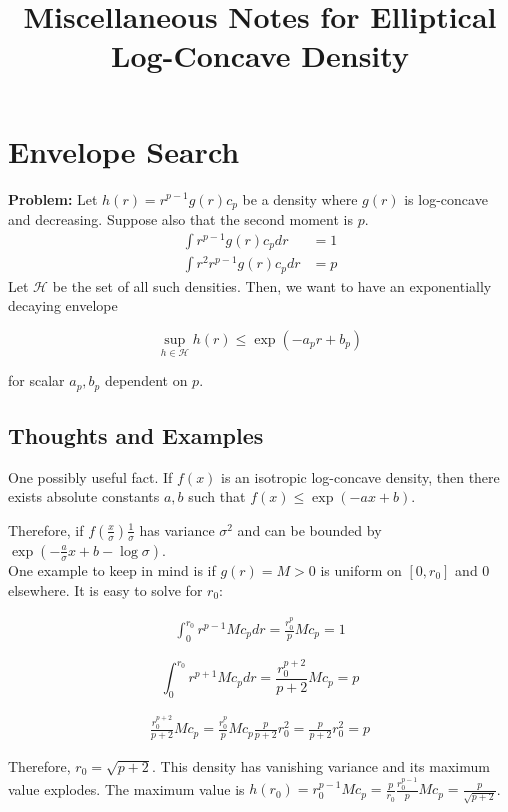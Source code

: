 \documentclass{article}
\title{Miscellaneous Notes for Elliptical Log-Concave Density}
\begin{document}
\maketitle

\section{Envelope Search}

\textbf{Problem:} Let $h(r) = r^{p-1} g(r) c_p$ be a density where $g(r)$ is log-concave and decreasing. Suppose also that the second moment is $p$. 
\begin{align*}
\int r^{p-1} g(r) c_p dr &= 1 \\
\int r^2 r^{p-1} g(r) c_p dr & = p
\end{align*}
Let $\mathcal{H}$ be the set of all such densities. Then, we want to have an exponentially decaying envelope

\[
\sup_{h \in \mathcal{H}} h(r) \leq \exp( - a_p r + b_p )
\]

for scalar $a_p, b_p$ dependent on $p$.

\subsection{Thoughts and Examples}

One possibly useful fact. If $f(x)$ is an isotropic log-concave density, then there exists absolute constants $a,b$ such that $f(x) \leq \exp( - a x + b)$. 

Therefore, if $f( \frac{x}{\sigma} ) \frac{1}{\sigma}$ has variance $\sigma^2$ and can be bounded by $\exp( - \frac{a}{\sigma} x + b - \log \sigma)$. \\




One example to keep in mind is if $g(r) = M > 0$ is uniform on $[0, r_0]$ and $0$ elsewhere. It is easy to solve for $r_0$:

\begin{align*}
\int_0^{r_0} r^{p-1} M c_p dr = \frac{r_0^p}{p} M c_p = 1
\end{align*}

\[
\int_0^{r_0} r^{p+1} M c_p dr = \frac{r_0^{p+2}}{p+2} M c_p = p 
\]

\begin{align*}
\frac{r_0^{p+2}}{p+2} M c_p = \frac{r_0^p}{p} M c_p \frac{p}{p+2} r_0^2 = \frac{p}{p+2} r_0^2 = p
\end{align*}

Therefore, $r_0 = \sqrt{p+2}$. This density has vanishing variance and its maximum value explodes. The maximum value is $h(r_0) = r_0^{p-1} M c_p = \frac{p}{r_0} \frac{r_0^{p-1}}{p} M c_p = \frac{p}{\sqrt{p+2}}$. 
\end{document}
